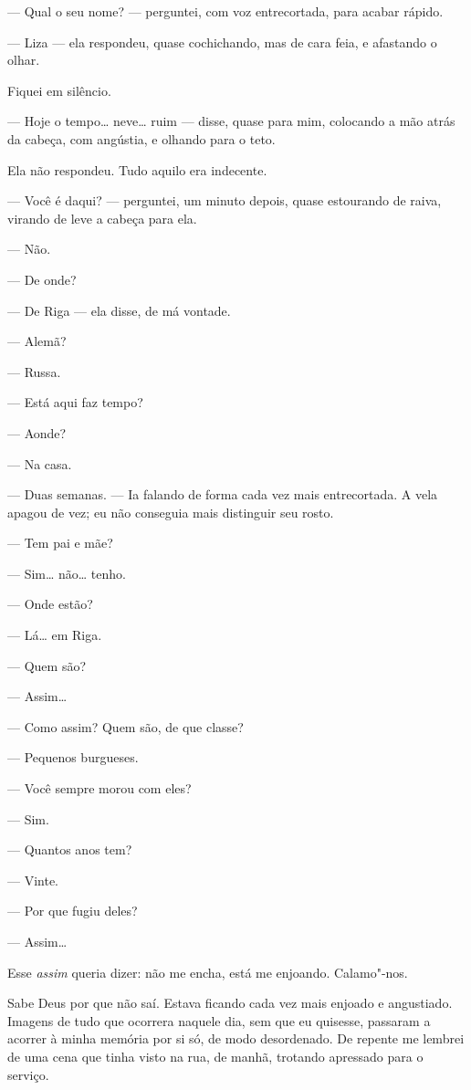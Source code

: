 --- Qual o seu nome? --- perguntei, com voz entrecortada, para acabar
rápido.

--- Liza --- ela respondeu, quase cochichando, mas de cara feia, e
afastando o olhar.

Fiquei em silêncio.

--- Hoje o tempo\ldots{} neve\ldots{} ruim --- disse, quase para mim, colocando a
mão atrás da cabeça, com angústia, e olhando para o teto.

Ela não respondeu. Tudo aquilo era indecente.

--- Você é daqui? --- perguntei, um minuto depois, quase estourando de
raiva, virando de leve a cabeça para ela.

--- Não.

--- De onde?

--- De Riga --- ela disse, de má vontade.

--- Alemã?

--- Russa.

--- Está aqui faz tempo?

--- Aonde?

--- Na casa.

--- Duas semanas. --- Ia falando de forma cada vez mais entrecortada. A vela
apagou de vez; eu não conseguia mais distinguir seu rosto.

--- Tem pai e mãe?

--- Sim\ldots{} não\ldots{} tenho.

--- Onde estão?

--- Lá\ldots{} em Riga.

--- Quem são?

--- Assim\ldots{}

--- Como assim? Quem são, de que classe?

--- Pequenos burgueses.

--- Você sempre morou com eles?

--- Sim.

--- Quantos anos tem?

--- Vinte.

--- Por que fugiu deles?

--- Assim\ldots{}

Esse \emph{assim} queria dizer: não me encha, está me enjoando.
Calamo"-nos.

Sabe Deus por que não saí. Estava ficando cada vez mais enjoado e
angustiado. Imagens de tudo que ocorrera naquele dia, sem que eu
quisesse, passaram a acorrer à minha memória por si só, de modo
desordenado. De repente me lembrei de uma cena que tinha visto na rua,
de manhã, trotando apressado para o serviço.

